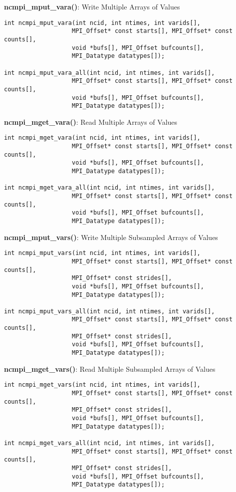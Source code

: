 {\bf ncmpi\_mput\_vara()}: Write Multiple Arrays of Values

\begin{verbatim}
int ncmpi_mput_vara(int ncid, int ntimes, int varids[],
                   MPI_Offset* const starts[], MPI_Offset* const counts[],
                   void *bufs[], MPI_Offset bufcounts[],
                   MPI_Datatype datatypes[]);

int ncmpi_mput_vara_all(int ncid, int ntimes, int varids[], 
                   MPI_Offset* const starts[], MPI_Offset* const counts[], 
                   void *bufs[], MPI_Offset bufcounts[],
                   MPI_Datatype datatypes[]);
\end{verbatim}


{\bf ncmpi\_mget\_vara()}: Read Multiple Arrays of Values

\begin{verbatim}
int ncmpi_mget_vara(int ncid, int ntimes, int varids[], 
                   MPI_Offset* const starts[], MPI_Offset* const counts[], 
                   void *bufs[], MPI_Offset bufcounts[],
                   MPI_Datatype datatypes[]);

int ncmpi_mget_vara_all(int ncid, int ntimes, int varids[], 
                   MPI_Offset* const starts[], MPI_Offset* const counts[], 
                   void *bufs[], MPI_Offset bufcounts[],
                   MPI_Datatype datatypes[]);
\end{verbatim}


{\bf ncmpi\_mput\_vars()}: Write Multiple Subsampled Arrays of Values

\begin{verbatim}
int ncmpi_mput_vars(int ncid, int ntimes, int varids[],
                   MPI_Offset* const starts[], MPI_Offset* const counts[],
                   MPI_Offset* const strides[],
                   void *bufs[], MPI_Offset bufcounts[],
                   MPI_Datatype datatypes[]);

int ncmpi_mput_vars_all(int ncid, int ntimes, int varids[], 
                   MPI_Offset* const starts[], MPI_Offset* const counts[], 
                   MPI_Offset* const strides[],
                   void *bufs[], MPI_Offset bufcounts[],
                   MPI_Datatype datatypes[]);
\end{verbatim}


{\bf ncmpi\_mget\_vars()}: Read Multiple Subsampled Arrays of Values

\begin{verbatim}
int ncmpi_mget_vars(int ncid, int ntimes, int varids[], 
                   MPI_Offset* const starts[], MPI_Offset* const counts[], 
                   MPI_Offset* const strides[],
                   void *bufs[], MPI_Offset bufcounts[],
                   MPI_Datatype datatypes[]);

int ncmpi_mget_vars_all(int ncid, int ntimes, int varids[], 
                   MPI_Offset* const starts[], MPI_Offset* const counts[], 
                   MPI_Offset* const strides[],
                   void *bufs[], MPI_Offset bufcounts[],
                   MPI_Datatype datatypes[]);
\end{verbatim}


